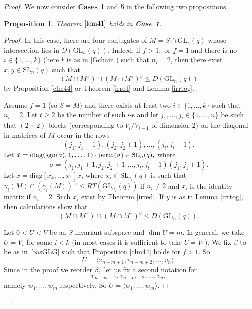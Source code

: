 \documentclass[a4paper,reqno,11pt]{amsart}
\newtheorem{Prop}[Th]{Proposition}
\theoremstyle{definition}
\theoremstyle{remark}
\numberwithin{equation}{section}
\newcommand{\diag}{\mathrm{diag}}
\newcommand{\sgn}{\mathrm{sgn}}
\newcommand{\SL}{{\mathrm{SL}}}
\newcommand{\GL}{{\mathrm{GL}}}
\begin{document}
\begin{proof}
We now consider {\bf Cases 1} and {\bf 5} in the following two propositions. 



\begin{Prop}
\label{case1prop}
Theorem $\ref{lem41}$ holds in {\bf Case 1}.
\end{Prop} 
\begin{proof}
In this case, there are four conjugates of $M=S \cap \GL_n(q)$ whose intersection lies in $D(\GL_n(q)).$ Indeed, if $f>1,$ or $f=1$ and there is no $i \in \{1, \ldots, k\}$ (here $k$ is as in \eqref{Gchain}) such that $n_i=2$, then 
 there exist $x,y \in \SL_n(q)$ such that 
$$(M \cap M^x) \cap (M \cap M^x)^y \le D(\GL_n(q))$$
by Proposition \ref{clm44}  or Theorem \ref{irred}  and Lemma \ref{irrtog}.


Assume $f=1$ (so $S=M$) and there exists at least two $i \in \{1, \ldots, k\}$ such that $n_i=2.$ Let $t\ge 2$ be the number of such $i$-s and let $j_1, \ldots, j_t \in \{1, \ldots, n\}$ be such that    $(2 \times 2)$ blocks (corresponding to $V_i/V_{i-1}$ of dimension $2$) on the diagonal in matrices of $M$ occur in the rows $$(j_1, j_1+1), (j_2, j_2 +1), \ldots, (j_t, j_t+1).$$ 
Let $\tilde{x}=\diag(\sgn(\sigma), 1, \ldots, 1) \cdot {\rm perm}(\sigma) \in \SL_n(q),$ where  $$\sigma=(j_1, j_1+1, j_2, j_2 +1, \ldots, j_t, j_t+1)(j_1, j_1+1).$$  Let $x= \diag[x_k, \ldots, x_1]\tilde{x}$, where $x_i\in \SL_{n_i}(q)$ is such that $\gamma_i(M) \cap (\gamma_i(M))^{x_i} \le RT(\GL_{n_i}(q))$ if $n_i \ne 2$ and $x_i$ is the identity matrix if $n_i=2.$ Such $x_i$ exist by Theorem \ref{irred}. If $y$ is as in Lemma \ref{irrtog}, then calculations show that  
\begin{equation}\label{m4diag}
(M \cap M^x) \cap (M \cap M^x)^y \le D(\GL_n(q)).
\end{equation}









Let $0<U <V$ be an $S$-invariant subspace and $\dim U=m.$ In general, we take $U=V_i$ for some $i<k$ (in most cases it is sufficient to take $U=V_1$). We fix $\beta$ to be as in \eqref{basGLG} such that Proposition \ref{clm44} holds for $f>1.$ So 
$$U = \langle v_{n-m+1}, v_{n-m+2}, \ldots, v_n \rangle.$$ Since in the proof we reorder $\beta,$ let us fix a second notation for  $$v_{n-m+1}, v_{n-m+2}, \ldots, v_n,$$ namely 
$w_1, \ldots, w_m$
respectively. So $U = \langle w_1, \ldots, w_m \rangle.$


\end{proof}
\end{proof}
\end{document}
